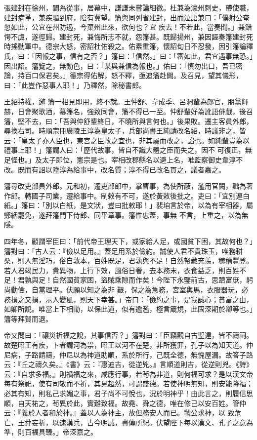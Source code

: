 \begin{pinyinscope}
 張建封在徐州，闢為從事，居幕中，謙謙未嘗論細微。杜兼為濠州刺史，帶使職，建封病革，兼疾驅到府，陰有冀望。籓與同列省建封，出而泣語兼曰：「僕射公奄忽如此，公宜在州防遏，今棄州此來，欲何也？宜
 疾去！不若此，當奏聞。」兼錯愕不虞，遂徑歸。建封死，兼悔所志不就，怨籓甚。既歸揚州，兼因誣奏籓建封死時搖動軍中。德宗大怒，密詔杜佑殺之。佑素重籓，懷詔旬日不忍發，因引籓論釋氏，曰：「因報之事，信有之否？」籓曰：「信然。」曰：「審如此，君宜遇事無恐。」因出詔。籓覽之，無動色，曰：「某與兼信為報也。」佑曰：「慎勿出口，吾已密論，持百口保君矣。」德宗得佑解，怒不釋，亟追籓赴闕。及召見，望其儀形，曰：「此豈作惡事人耶！」乃釋然，除秘書郎。



 王紹持權，邀
 籓一相見即用，終不就。王仲舒、韋成季、呂洞輩為郎官，朋黨輝赫，日會聚歌酒，慕籓名，強致同會，籓不得已一至。仲舒輩好為訛語俳戲，後召籓，堅不去，曰：「吾與仲舒輩終日，不曉所與言何也。」後果敗。遷主客員外郎，尋換右司。時順宗冊廣陵王淳為皇太子，兵部尚書王純請改名紹，時議非之，皆云：「皇太子亦人臣也，東宮之臣改之宜也，非其屬而改之，諂也。如純輩豈為以禮事上耶！」籓謂人曰：「歷代故事，皆自不識大體之臣而失之，因不
 可復正，無足怪也。」及太子即位，憲宗是也。宰相改郡縣名以避上名，唯監察御史韋淳不改。既而有詔以陸淳為給事中，改名質；淳不得已改名貫之，議者嘉之。



 籓尋改吏部員外郎。元和初，遷吏部郎中，掌曹事，為使所蔽，濫用官闕，黜為著作郎。轉國子司業，遷給事中。制敕有不可，遂於黃敕後批之。吏曰：「宜別連白紙。」籓曰：「別以白紙，是文狀，豈曰批敕耶！」裴垍言於帝，以為有宰相器，屬鄭絪罷免，遂拜籓門下侍郎、同平章事。籓性忠藎，事無
 不言，上重之，以為無隱。



 四年冬，顧謂宰臣曰：「前代帝王理天下，或家給人足，或國貧下困，其故何也？」籓對曰：「古人云：『儉以足用。』蓋足用系於儉約。誠使人君不貴珠玉，唯務耕桑，則人無淫巧，俗自敦本，百姓既足，君孰與不足！自然帑藏充羨，稼穡豐登。若人君竭民力，貴異物，上行下效，風俗日奢，去本務末，衣食益乏，則百姓不足！君孰與足！自然國貧家困，盜賊乘隙而作矣！今陛下永鑒前古，思躋富庶，躬尚勤儉，自當理平。伏願以知之為非
 艱，保之為急務，宮室輿馬，衣服器玩，必務損之又損，示人變風，則天下幸甚。」帝曰：「儉約之事，是我誠心；貧富之由，如卿所說。唯當上下相勖，以保此道，似有逾濫，極言箴規，此固深期於卿等也。」籓等拜賀而退。



 帝又問曰：「禳災祈福之說，其事信否？」籓對曰：「臣竊觀自古聖達，皆不禱祠。故楚昭王有疾，卜者謂河為祟，昭王以河不在楚，非所獲罪，孔子以為知天道。仲尼病，子路請禱，仲尼以為神道助順，系於所行，己既全德，無愧屋漏。故答子路
 云：『丘之禱久矣。』《書》云：『惠迪吉，從逆兇。』言順道則吉，從逆則兇。《詩》云：『自求多福。』則禍福之來，咸應行事，若茍為非道，則何福可求？是以漢文帝每有祭祀，使有司敬而不祈，其見超然，可謂盛德。若使神明無知，則安能降福；必其有知，則私己求媚之事，君子尚不可悅也，況於明神乎！由此言之，則履信思順，自天祐之，茍異於此，實難致福。故堯、舜之德，唯在修己以安百姓。管仲云：『義於人者和於神。』蓋以人為神主，故但務安人而已。虢公求神，以
 致危亡，王莽妄祈，以速漢兵，古今明誡，書傳所紀。伏望陛下每以漢文、孔子之意為準，則百福具臻。」帝深嘉之。




\end{pinyinscope}
